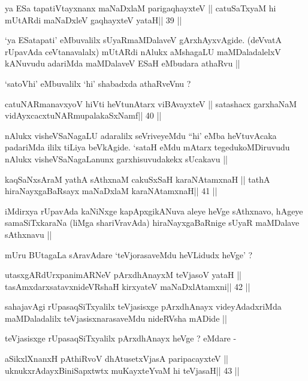 \begin{shl}
ya ESa tapatiVtayxnanx maNaDxlaM parigaqhayxteV ||
catuSaTxyaM hi mUtARdi maNaDxleV gaqhayxteV yataH\hfill || 39 ||
\end{shl}

\begin{artha}
`ya ESatapati' eMbuvalilx sUyaRmaMDalaveV gArxhAyxvAgide. (deVvatA
rUpavAda ceVtanavalalx) mUtARdi nAlukx aMshagaLU maMDaladalelxV
kANuvudu adariMda maMDalaveV ESaH eMbudara athaRvu ||

`satoVhi' eMbuvalilx `hi' shabadxda athaRveVnu ?
\end{artha}

\begin{shl}
catuNARmanavxyoV hiVti heVtunA\s tarx viBAvayxteV ||
satashacx garxhaNaM vidAyxcacxtuNARmupalakaSxNamf\hfill || 40 ||
\end{shl}

\begin{artha}
nAlukx visheVSaNagaLU adaralilx seVriveyeMdu ``hi' eMba heVtuvAcaka
padariMda ililx tiLiya beVkAgide. `sataH eMdu mAtarx tegedukoMDiruvudu
nAlukx visheVSaNagaLanunx garxhisuvudakekx sUcakavu ||
\end{artha}

\begin{shl}
kaqSaNxsAraM yathA sAthxnaM cakuSxSaH karaNAtamxnaH ||
tathA hiraNayxgaBaRsayx maNaDxlaM karaNAtamxnaH\hfill || 41 ||
\end{shl}

\begin{artha}
iMdirxya rUpavAda kaNiNxge kapApxgikANuva aleye heVge sAthxnavo,
hAgeye samaSiTxkaraNa (liMga shariVravAda) hiraNayxgaBaRnige sUyaR
maMDalave sAthxnavu ||

mUru BUtagaLa sAravAdare `teVjorasaveMdu heVLidudx heVge' ?
\end{artha}

\begin{shl}
utasxgARdUrxpanimARNeV pArxdhAnayxM teVjasoV yataH ||
tasAmxdarxsatavxnideVRshaH kirxyateV maNaDxlAtamxni\hfill || 42 ||
\end{shl}

\begin{artha}
sahajavAgi rUpasaqSiTxyalilx teVjasisxge pArxdhAnayx videyAdadxriMda
maMDaladalilx teVjasisxnarasaveMdu nideRVsha mADide ||

teVjasisxge rUpasaqSiTxyalilx pArxdhAnayx heVge ? eMdare -
\end{artha}

\begin{shl}
aSikxlXnanxH pAthiRvoV dhAtusetxVjasA paripacayxteV ||
uknukxrAdayxBiniSapxtwtx muKayxteYvaM hi teVjasaH\hfill || 43 ||
\end{shl}

